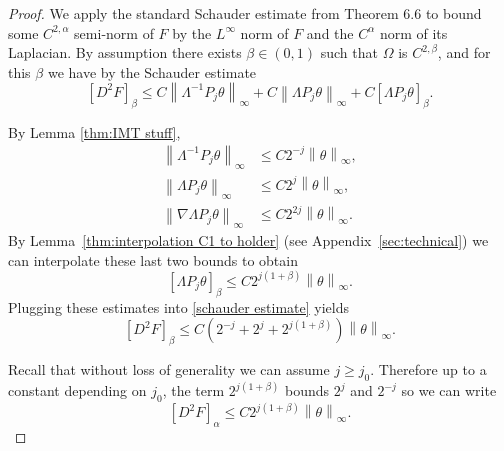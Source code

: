 \documentclass[11pt]{amsart}
\theoremstyle{remark}
\theoremstyle{definition}
\newcommand{\norm}[1]{\left\lVert#1\right\rVert}
\newcommand{\paren}[1]{\left( #1 \right)}
\newcommand{\bracket}[1]{\left[ #1 \right]}
\newcommand{\grad}{\nabla}
\newcommand{\Laplace}{\Delta}
\begin{document}
\begin{proof}



We apply the standard Schauder estimate from \cite{GiTr} Theorem 6.6 to bound some $C^{2,\alpha}$ semi-norm of $F$ by the $L^\infty$ norm of $F$ and the $C^\alpha$ norm of its Laplacian.  By assumption there exists $\beta \in (0,1)$ such that $\Omega$ is $C^{2,\beta}$, and for this $\beta$ we have by the Schauder estimate
\begin{equation} \label{schauder estimate} \bracket{D^2 F}_{\beta} \leq C \norm{\Lambda^{-1} P_j \theta}_\infty + C \norm{\Lambda P_j \theta}_\infty + C \bracket{\Lambda P_j \theta}_{\beta}. \end{equation}

By Lemma \ref{thm:IMT stuff},
\begin{align*} 
\norm{\Lambda^{-1} P_j \theta}_\infty &\leq C 2^{-j} \norm{\theta}_\infty, \\
\norm{\Lambda P_j \theta}_\infty &\leq C 2^j \norm{\theta}_\infty, \\
\norm{\grad \Lambda P_j \theta}_\infty &\leq C 2^{2j} \norm{\theta}_\infty. 
\end{align*}
By Lemma~\ref{thm:interpolation C1 to holder} (see Appendix~\ref{sec:technical}) we can interpolate these last two bounds to obtain
\[ \bracket{\Lambda P_j \theta}_\beta \leq C 2^{j(1+\beta)} \norm{\theta}_\infty. \]
Plugging these estimates into \eqref{schauder estimate} yields
\[ \bracket{D^2 F}_\beta \leq C \paren{2^{-j} + 2^j + 2^{j(1+\beta)}} \norm{\theta}_\infty. \]

Recall that without loss of generality we can assume $j \geq j_0$.  Therefore up to a constant depending on $j_0$, the term $2^{j(1+\beta)}$ bounds $2^j$ and $2^{-j}$ so we can write
\[ \bracket{D^2 F}_\alpha \leq C 2^{j(1+\beta)} \norm{\theta}_\infty. \]


\end{proof}
\end{document}
